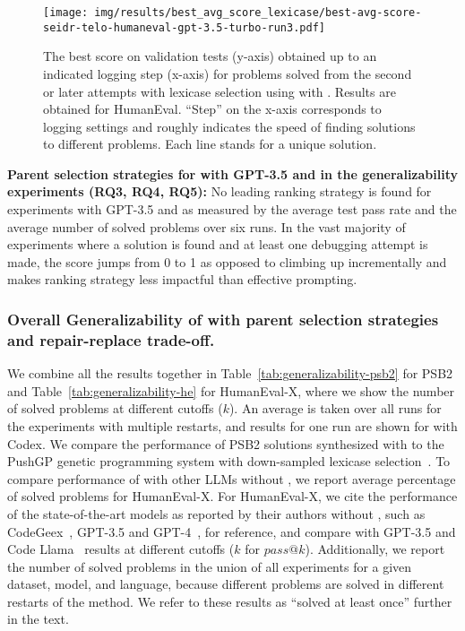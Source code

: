 \begin{figure}[t]
\centering
\texttt{[image: img/results/best\_avg\_score\_lexicase/best-avg-score-seidr-telo-humaneval-gpt-3.5-turbo-run3.pdf]}
\caption{The best score on validation tests (y-axis) obtained up to an indicated logging step (x-axis) for problems solved from the second or later attempts with lexicase selection using \method{} with \gpt{}. Results are obtained for HumanEval. ``Step'' on the x-axis corresponds to logging settings and roughly indicates the speed of finding solutions to different problems. Each line stands for a unique solution.}
\label{fig:lexicase-tpr-jumps}
\end{figure}


\begin{framed}
\textbf{Parent selection strategies for \method{} with GPT-3.5 and \llama{} in the generalizability experiments (RQ3, RQ4, RQ5):} 
No leading ranking strategy is found for \method{} experiments with GPT-3.5 and \llama{} as measured by the average test pass rate and the average number of solved problems over six runs. 
In the vast majority of experiments where a solution is found and at least one debugging attempt is made, the score jumps from 0 to 1 as opposed to climbing up incrementally and makes ranking strategy less impactful than effective prompting. 
\end{framed}

\subsubsection{Overall Generalizability of \method{} with parent selection strategies and repair-replace trade-off.}
\label{sec:seidr-overall-generalizability}

We combine all the results together in Table~\ref{tab:generalizability-psb2} for PSB2 and Table~\ref{tab:generalizability-he} for HumanEval-X, where we show the number of solved problems at different cutoffs ($k$). 
An average is taken over all runs for the experiments with multiple restarts, and results for one run are shown for \method{} with Codex. 
We compare the performance of PSB2 solutions synthesized with \method{} to the PushGP genetic programming system with down-sampled lexicase selection~\cite{helmuth2022:problemsolving}. 
To compare performance of \method{} with other LLMs without \method{}, we report average percentage of solved problems for HumanEval-X. 
For HumanEval-X, we cite the performance of the state-of-the-art models as reported by their authors without \method{}, such as CodeGeex~\cite{zheng2023:codegeex}, GPT-3.5 and GPT-4~\cite{openai2023:gpt4}, for reference, and compare \method{} with GPT-3.5 and Code Llama~\cite{roziere2023:code} results at different cutoffs ($k$ for $pass@k$).
Additionally, we report the number of solved problems in the union of all experiments for a given dataset, model, and language, because different problems are solved in different restarts of the method. We refer to these results as ``solved at least once'' further in the text.

